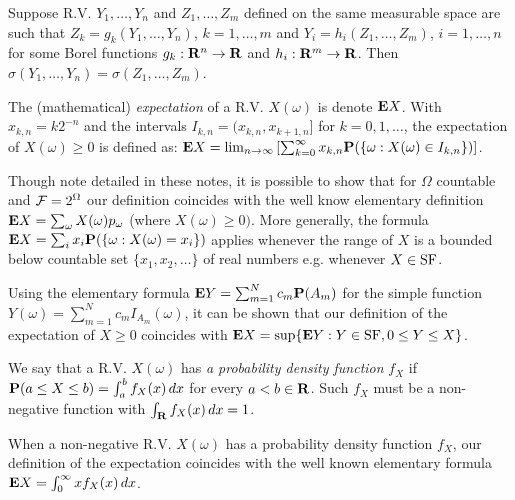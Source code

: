 \begin{corollary*} 
Suppose R.V. $Y_1, \dots, Y_n$ and $Z_1, \dots, Z_m$ defined on the same
measurable space are such that $Z_k = g_k(Y_1, \dots, Y_n)$, $k = 1, \dots, m$
and $Y_i = h_i(Z_1, \dots, Z_m)$, $i = 1, \dots, n$ for some Borel functions
$g_k: \mathbf{R}^n \rightarrow \mathbf{R}$ and $h_i: \mathbf{R}^m \rightarrow \mathbf{R}$. Then $\sigma(Y_1,
\dots, Y_n) = \sigma(Z_1, \dots, Z_m)$.
\end{corollary*} 

\begin{definition*} 
The (mathematical) \emph{expectation} of a R.V. $X(\omega)$ is denote $\mathbf{E} X$.
With $x_{k, n} = k2^{-n}$ and the intervals $I_{k, n} = (x_{k, n}, x_{k+1, n}]$
for $k = 0, 1, \dots$, the expectation of $X(\omega) \ge 0$ is defined as:
$\mathbf{E} X = \lim_{n\rightarrow \infty} \left[ 
	\sum_{k=0}^\infty x_{k, n} \mathbf{P}(\{\omega: X(\omega) \in I_{k, n} \}) \right]$.
\end{definition*} 

\begin{example*} 
Though note detailed in these notes, it is possible to show that for $\Omega$
countable and $\mathcal{F} = 2^\Omega$ our definition coincides with the well know
elementary definition $\mathbf{E} X = \sum_\omega X(\omega) p_\omega$ (where $X(\omega)
\ge 0)$. More generally, the formula $\mathbf{E} X = \sum_i x_i \mathbf{P}(\{\omega :
X(\omega) = x_i\})$ applies whenever the range of $X$ is a bounded below countable
set $\{x_1, x_2, \dots\}$ of real numbers e.g. whenever $X \in \operatorname{SF}$.
\end{example*} 

\begin{remark*} 
Using the elementary formula $\mathbf{E} Y = \sum_{m=1}^N c_m \mathbf{P}(A_m)$ for the simple
function $Y(\omega) = \sum_{m=1}^N c_m I_{A_m} (\omega)$, it can be shown that
our definition of the expectation of $X \ge 0$ coincides with $\mathbf{E} X = \sup\{ \mathbf{E}
Y: Y \in \operatorname{SF}, 0 \le Y \le X\}$.
\end{remark*} 

\begin{definition*} 
We say that a R.V. $X(\omega)$ has \emph{a probability density function} $f_X$
if $\mathbf{P}(a \le X \le b) = \int_a^b f_X(x)\,dx$ for every $a < b \in \mathbf{R}$. Such
$f_X$ must be a non-negative function with $\int_{\mathbf{R}} f_X(x)\,dx = 1$.
\end{definition*} 

\begin{proposition*} 
When a non-negative R.V. $X(\omega)$ has a probability density function $f_X$,
our definition of the expectation coincides with the well known elementary
formula $\mathbf{E} X = \int_0^\infty x f_X(x)\,dx$.
\end{proposition*} 


